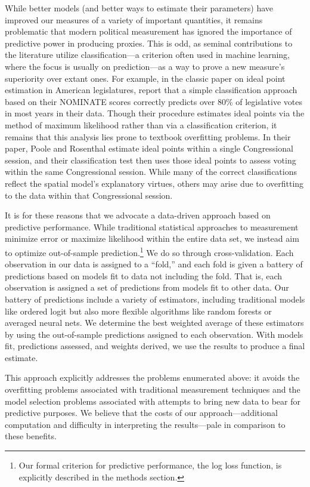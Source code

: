 While better models (and better ways to estimate their parameters) have improved our measures of a variety of important quantities, it remains problematic that modern political measurement has ignored the importance of predictive power in producing proxies.
This is odd, as seminal contributions to the literature utilize classification---a criterion often used in machine learning, where the focus is usually on prediction---as a way to prove a new measure's superiority over extant ones. For example, in the classic paper on ideal point estimation in American legislatures, \citet[Table 3]{poole1985} report that a simple classification approach based on their NOMINATE scores correctly predicts over 80\% of legislative votes in most years in their data. Though their procedure estimates ideal points via the method of maximum likelihood rather than via a classification criterion, it remains that this analysis lies prone to textbook overfitting problems.
In their paper, Poole and Rosenthal estimate ideal points within a single Congressional session, and their classification test then uses those ideal points to assess voting within the same Congressional session.
While many of the correct classifications reflect the spatial model's explanatory virtues, others may arise due to overfitting to the data within that Congressional session.

It is for these reasons that we advocate a data-driven approach based on predictive performance.  While traditional statistical approaches to measurement minimize error or maximize likelihood within the entire data set, we instead aim to optimize out-of-sample prediction.\footnote{Our formal criterion for predictive performance, the log loss function, is explicitly described in the methods section.}
We do so through cross-validation.
Each observation in our data is assigned to a ``fold,'' and each fold is given a battery of predictions based on models fit to data not including the fold.  
That is, each observation is assigned a set of predictions from models fit to other data.
Our battery of predictions include a variety of estimators, including traditional models like ordered logit but also more flexible algorithms like random forests or averaged neural nets. 
We determine the best weighted average of these estimators by using the out-of-sample predictions assigned to each observation.
With models fit, predictions assessed, and weights derived, we use the results to produce a final estimate.

This approach explicitly addresses the problems enumerated above: it avoids the overfitting problems associated with traditional measurement techniques and the model selection problems associated with attempts to bring new data to bear for predictive purposes.
We believe that the costs of our approach---additional computation and difficulty in interpreting the results---pale in comparison to these benefits.

